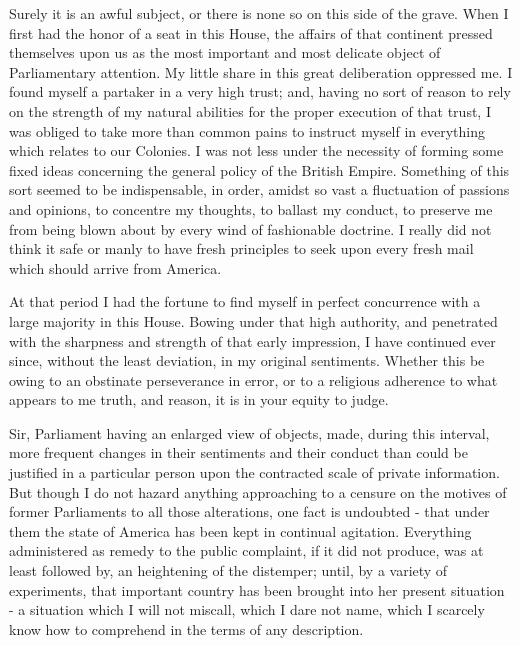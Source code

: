 Surely it is an awful subject, or there is none so on this side of the grave. When I first had the honor of a seat in this House, the affairs of that continent pressed themselves upon us as the most important and most delicate object of Parliamentary attention. My little share in this great deliberation oppressed me. I found myself a partaker in a very high trust; and, having no sort of reason to rely on the strength of my natural abilities for the proper execution of that trust, I was obliged to take more than common pains to instruct myself in everything which relates to our Colonies. I was not less under the necessity of forming some fixed ideas concerning the general policy of the British Empire. Something of this sort seemed to be indispensable, in order, amidst so vast a fluctuation of passions and opinions, to concentre my thoughts, to ballast my conduct, to preserve me from being blown about by every wind of fashionable doctrine. I really did not think it safe or manly to have fresh principles to seek upon every fresh mail which should arrive from America.\par

At that period I had the fortune to find myself in perfect concurrence with a large majority in this House. Bowing under that high authority, and penetrated with the sharpness and strength of that early impression, I have continued ever since, without the least deviation, in my original sentiments. Whether this be owing to an obstinate perseverance in error, or to a religious adherence to what appears to me truth, and reason, it is in your equity to judge.\par

Sir, Parliament having an enlarged view of objects, made, during this interval, more frequent changes in their sentiments and their conduct than could be justified in a particular person upon the contracted scale of private information. But though I do not hazard anything approaching to a censure on the motives of former Parliaments to all those alterations, one fact is undoubted - that under them the state of America has been kept in continual agitation. Everything administered as remedy to the public complaint, if it did not produce, was at least followed by, an heightening of the distemper; until, by a variety of experiments, that important country has been brought into her present situation - a situation which I will not miscall, which I dare not name, which I scarcely know how to comprehend in the terms of any description.\par

